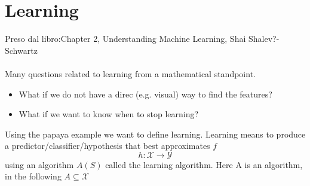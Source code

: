 \section{Learning}
Preso dal libro:Chapter 2, Understanding Machine Learning, Shai Shalev?-Schwartz \\\\
Many questions related to learning from a mathematical standpoint. \begin{itemize}
    \item What if we do not have a direc (e.g. visual) way to find the features?
    \item What if we want to know when to stop learning?
\end{itemize}
Using the papaya example we want to define learning. Learning means to produce a predictor/classifier/hypothesis that best approximates $f$
\[ 
    h: \mathcal{X} \longrightarrow \mathcal{Y}
\]using an algorithm $A(S)$ called the learning algorithm.
Here A is an algorithm, in the following $A\subseteq \mathcal{X}$
